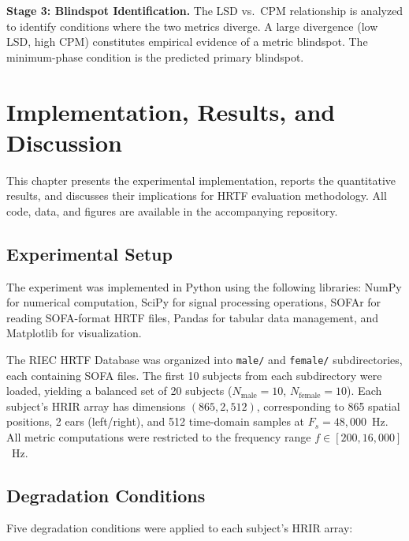 \documentclass[12pt,a4paper]{article}
\begin{document}
\textbf{Stage 3: Blindspot Identification.}
The LSD vs.\ CPM relationship is analyzed to identify conditions where the two metrics diverge. A large divergence (low LSD, high CPM) constitutes empirical evidence of a metric blindspot. The minimum-phase condition is the predicted primary blindspot.



\newpage
\section{Implementation, Results, and Discussion}

This chapter presents the experimental implementation, reports the quantitative results, and discusses their implications for HRTF evaluation methodology. All code, data, and figures are available in the accompanying repository.

\subsection{Experimental Setup}

The experiment was implemented in Python using the following libraries: NumPy for numerical computation, SciPy for signal processing operations, SOFAr for reading SOFA-format HRTF files, Pandas for tabular data management, and Matplotlib for visualization.

The RIEC HRTF Database \cite{watanabe2014} was organized into \texttt{male/} and \texttt{female/} subdirectories, each containing SOFA files. The first 10 subjects from each subdirectory were loaded, yielding a balanced set of 20 subjects ($N_{\mathrm{male}} = 10$, $N_{\mathrm{female}} = 10$). Each subject's HRIR array has dimensions $(865, 2, 512)$, corresponding to 865 spatial positions, 2 ears (left/right), and 512 time-domain samples at $F_s = 48{,}000$~Hz. All metric computations were restricted to the frequency range $f \in [200, 16{,}000]$~Hz.

\subsection{Degradation Conditions}

Five degradation conditions were applied to each subject's HRIR array:
\end{document}
